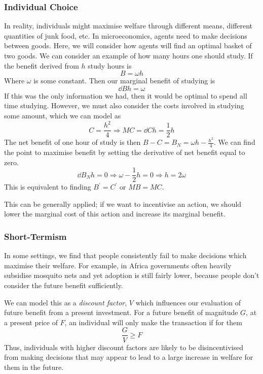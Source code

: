 \documentclass[12pt]{report}
\begin{document}
\begin{flushleft}
\subsubsection*{Individual Choice}
In reality, individuals might maximise welfare through different means,
different quantities of junk food, etc. In microeconomics, agents need to make
decisions between goods. Here, we will consider how agents will find an optimal
basket of two goods. We can consider an example of how many hours one should
study. If the benefit derived from \(h\) study hours is
\[B = \omega h\]
Where \(\omega\) is some constant. Then our marginal benefit of studying is
\[\dd{B}{h} = \omega\]
If this was the only information we had, then it would be optimal to spend all
time studying. However, we must also consider the costs involved in studying
some amount, which we can model as
\[C = \frac{h^2}{4} \Rightarrow MC = \dd{C}{h} = \frac{1}{2}h\]
The net benefit of one hour of study is then
\(B - C = B_N = \omega h - \frac{h^2}{4}\).
We can find the point to maximise benefit by setting the derivative of net
benefit equal to zero.
\[\dd{B_N}{h} = 0 \Rightarrow \omega - \frac{1}{2}h = 0
\Rightarrow h = 2\omega\]
This is equivalent to finding \(B^\prime = C^\prime\) or \(MB = MC\). \par
This can be generally applied; if we want to incentivise an action, we should
lower the marginal cost of this action and increase its marginal benefit.

\subsubsection*{Short-Termism}
In some settings, we find that people consistently fail to make decisions which
maximise their welfare. For example, in Africa governments often heavily
subsidise mosquito nets and yet adoption is still fairly lower, because people
don't consider the future benefit sufficiently. \par
We can model this as a \textit{discount factor}, \(V\) which influences our
evaluation of future benefit from a present investment. For a future benefit of
magnitude \(G\), at a present price of \(F\), an individual will only make the
transaction if for them
\[\frac{G}{V} \geq F\]
Thus, individuals with higher discount factors are likely to be disincentivised
from making decisions that may appear to lead to a large increase in welfare for
them in the future.


\end{flushleft}
\end{document}
